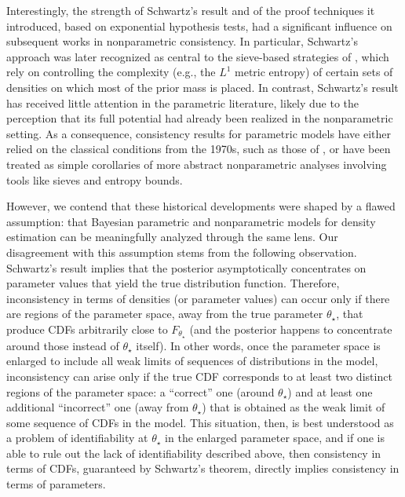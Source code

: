 \documentclass[11pt,twoside]{article}
\begin{document}
Interestingly, the strength of Schwartz’s result and of the proof techniques it introduced, based on exponential hypothesis tests, had a significant influence on subsequent works in nonparametric consistency. In particular, Schwartz's approach was later recognized \citep{ghosal2017fundamentals} as central to the sieve-based strategies of \cite{barron1999, ghosal1999}, which rely on controlling the complexity (e.g., the $L^1$ metric entropy) of certain sets of densities on which most of the prior mass is placed. In contrast, Schwartz’s result has received little attention in the parametric literature, likely due to the perception that its full potential had already been realized in the nonparametric setting. As a consequence, consistency results for parametric models have either relied on the classical conditions from the 1970s, such as those of \cite{walker1969}, or have been treated as simple corollaries of more abstract nonparametric analyses involving tools like sieves and entropy bounds.

However, we contend that these historical developments were shaped by a flawed assumption: that Bayesian parametric and nonparametric models for density estimation can be meaningfully analyzed through the same lens. Our disagreement with this assumption stems from the following observation. Schwartz’s result implies that the posterior asymptotically concentrates on parameter values that yield the true distribution function. Therefore, inconsistency in terms of densities (or parameter values) can occur only if there are regions of the parameter space, away from the true parameter $\theta_\star$, that produce CDFs arbitrarily close to $F_{\theta_\star}$ (and the posterior happens to concentrate around those instead of $\theta_\star$ itself). In other words, once the parameter space is enlarged to include all weak limits of sequences of distributions in the model, inconsistency can arise only if the true CDF corresponds to at least two distinct regions of the parameter space: a ``correct'' one (around $\theta_\star$) and at least one additional ``incorrect'' one (away from $\theta_\star$) that is obtained as the weak limit of some sequence of CDFs in the model. This situation, then, is best understood as a problem of identifiability at $\theta_\star$ in the enlarged parameter space, and if one is able to rule out the lack of identifiability described above, then consistency in terms of CDFs, guaranteed by Schwartz’s theorem, directly implies consistency in terms of parameters.
\end{document}
